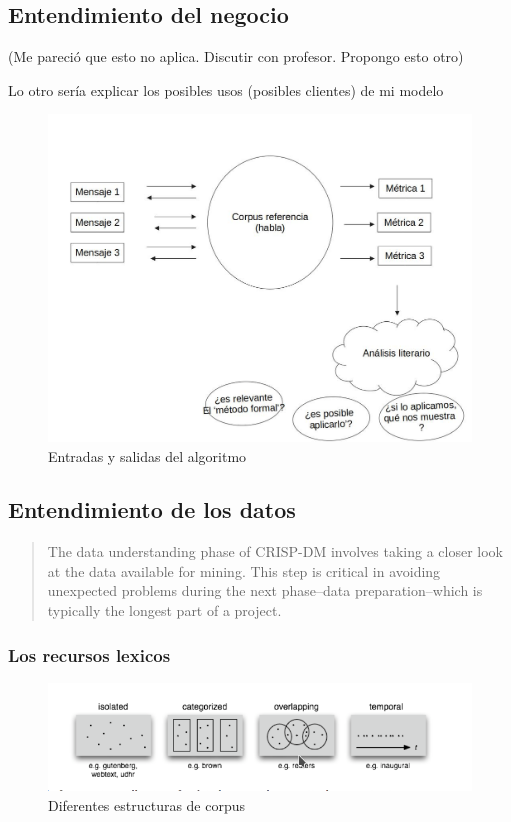 \documentclass[twoside]{article}
\begin{document}
\subsection{Entendimiento del negocio}
\label{sec:orgec2bbae}
(Me pareció que esto no aplica. Discutir con profesor. Propongo esto otro)

Lo otro sería explicar los posibles usos (posibles clientes) de mi modelo
\begin{figure}[htbp]
\centering
\includegraphics[width=.9\linewidth]{./assets/posibles_usos.jpg}
\caption{Entradas y salidas del algoritmo}
\end{figure}

\subsection{Entendimiento de los datos}
\label{sec:orge6df6e3}

\begin{quote}
The data understanding phase of CRISP-DM involves taking a closer
look at the data available for mining. This step is critical in
avoiding unexpected problems during the next phase--data
preparation--which is typically the longest part of a project.
\end{quote}

\subsubsection{Los recursos lexicos}
\label{sec:org7ff7aea}

\begin{figure}[htbp]
\centering
\includegraphics[width=.9\linewidth]{./assets/estructuras_de_corpus.png}
\caption{Diferentes estructuras de corpus}
\end{figure}
\end{document}
